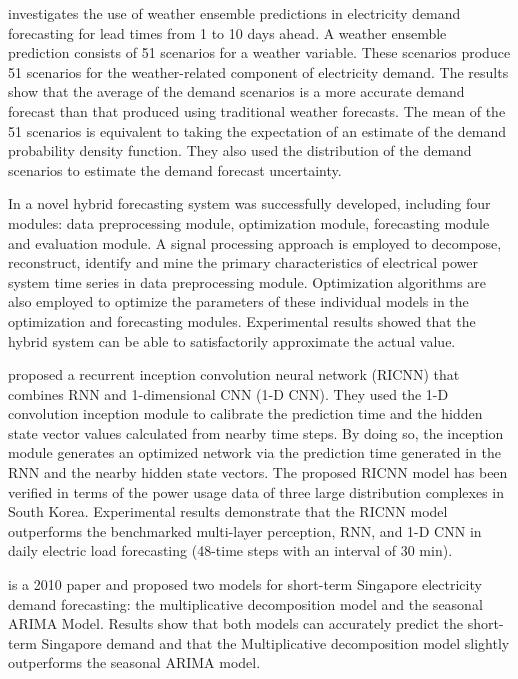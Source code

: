 \cite{TAYLOR200357} investigates the use of weather ensemble predictions in electricity demand forecasting for lead times from 1 to 10 days ahead.
A weather ensemble prediction consists of 51 scenarios for a weather variable.
These scenarios produce 51 scenarios for the weather-related component of electricity demand.
The results show that the average of the demand scenarios is a more accurate demand forecast than that produced using traditional weather forecasts.
The mean of the 51 scenarios is equivalent to taking the expectation of an estimate of the demand probability density function.
They also used the distribution of the demand scenarios to estimate the demand forecast uncertainty.

In \cite{DU2018533} a novel hybrid forecasting system was successfully developed, including four modules: data preprocessing module, optimization module, forecasting module and evaluation module.
A signal processing approach is employed to decompose, reconstruct, identify and mine the primary characteristics of electrical power system time series in data preprocessing module.
Optimization algorithms are also employed to optimize the parameters of these individual models in the optimization and forecasting modules.
Experimental results showed that the hybrid system can be able to satisfactorily approximate the actual value.

\cite{KIM2019328} proposed a recurrent inception convolution neural network (RICNN) that combines RNN and 1-dimensional CNN (1-D CNN).
They used the 1-D convolution inception module to calibrate the prediction time and the hidden state vector values calculated from nearby time steps.
By doing so, the inception module generates an optimized network via the prediction time generated in the RNN and the nearby hidden state vectors.
The proposed RICNN model has been verified in terms of the power usage data of three large distribution complexes in South Korea.
Experimental results demonstrate that the RICNN model outperforms the benchmarked multi-layer perception, RNN, and 1-D CNN in daily electric load forecasting (48-time steps with an interval of 30 min).

\cite{5518553} is a 2010 paper and proposed two models for short-term Singapore electricity demand forecasting: the multiplicative decomposition model and the seasonal ARIMA Model.
Results show that both models can accurately predict the short-term Singapore demand and that the Multiplicative decomposition model slightly outperforms the seasonal ARIMA model.

